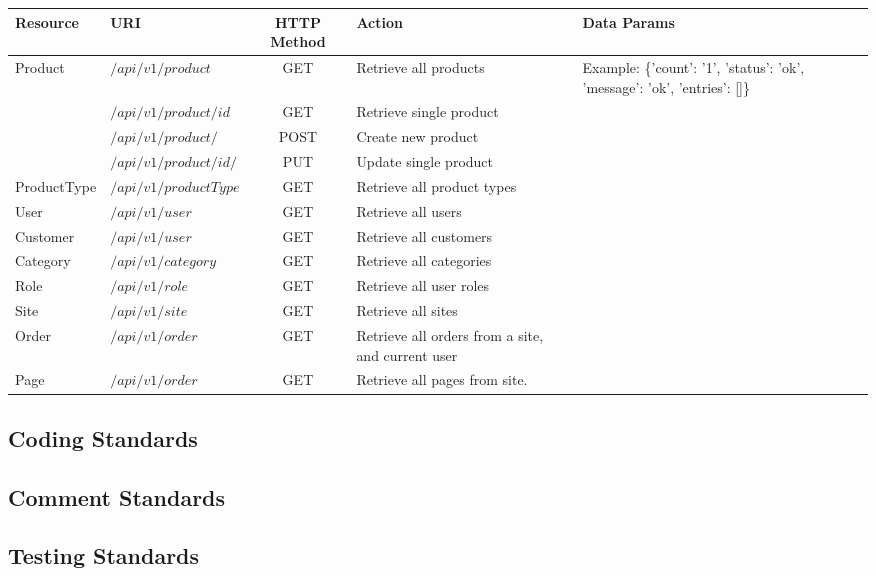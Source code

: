 \documentclass[12pt,letterpaper, margin=1in]{article}
\begin{document}
\begin{table}[ht]
\centering
\begin{adjustbox}{width=1\textwidth,center=\textwidth}
\small
\begin{tabular}{| l l c l l |}
\hline
\textbf{Resource} & \textbf{URI} & \textbf{HTTP Method} & \textbf{Action} & \textbf{Data Params} \\
\hline
Product & $/api/v1/product$ & GET & Retrieve all products & Example: \{'count': '1', 'status': 'ok', 'message': 'ok', 'entries': []\}  \\
 & $/api/v1/product/id$ & GET & Retrieve single product & \\
 & $/api/v1/product/$ & POST & Create new product & \\
& $/api/v1/product/id/$ & PUT & Update single product & \\
\hline
ProductType & $/api/v1/productType$ & GET & Retrieve all product types & \\
User & $/api/v1/user$ & GET & Retrieve all users & \\
Customer & $/api/v1/user$ & GET & Retrieve all customers & \\ 
Category & $/api/v1/category$ & GET & Retrieve all categories & \\
Role & $/api/v1/role$ & GET & Retrieve all user roles & \\ 
Site & $/api/v1/site$ & GET & Retrieve all sites & \\ 
Order & $/api/v1/order$ & GET & Retrieve all orders from a site, and current user & \\
Page & $/api/v1/order$ & GET & Retrieve all pages from site. & \\
\hline
\end{tabular}
\end{adjustbox}
\end{table}%

\subsection{Coding Standards}

\subsection{Comment Standards}

\subsection{Testing Standards}
\end{document}
